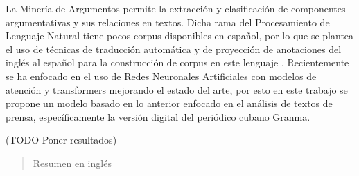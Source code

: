 \begin{resumen}

La Minería de Argumentos permite la extracción y clasificación de componentes argumentativas 
y sus relaciones en textos. Dicha rama del Procesamiento de Lenguaje Natural tiene pocos 
corpus disponibles en español, por lo que se plantea el uso de técnicas de traducción automática 
y de proyección de anotaciones del inglés al español para la construcción de corpus en este 
lenguaje \cite{eger2018cross} . Recientemente se ha enfocado en el uso de Redes Neuronales Artificiales 
con modelos de atención y transformers mejorando el estado del arte, por esto en este trabajo se 
propone un modelo basado en lo anterior enfocado en el análisis de textos de prensa, específicamente 
la versión digital del periódico cubano Granma.

(TODO Poner resultados)

\end{resumen}

\begin{abstract}
	Resumen en inglés
\end{abstract}